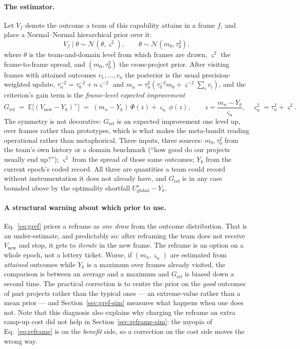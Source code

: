\documentclass[11pt]{article}
\newcommand{\E}{\mathbb{E}}
\begin{document}
\paragraph{The estimator.} Let $V_f$ denote the outcome a team of this capability attains in a frame $f$, and place a Normal--Normal hierarchical prior over it:
\begin{equation}
\label{eq:gref-prior}
V_f \mid \theta \sim \mathcal N(\theta,\varsigma^2),
\qquad \theta \sim \mathcal N(m_0,\tau_0^2),
\end{equation}
where $\theta$ is the team-and-domain level from which frames are drawn, $\varsigma^2$ the frame-to-frame spread, and $(m_0,\tau_0^2)$ the cross-project prior. After visiting frames with attained outcomes $v_1,\dots,v_n$ the posterior is the usual precision-weighted update, $\tau_n^{-2}=\tau_0^{-2}+n\varsigma^{-2}$ and $m_n=\tau_n^2(\tau_0^{-2}m_0+\varsigma^{-2}\sum_i v_i)$, and the criterion's gain term is the \emph{frame-level expected improvement}
\begin{equation}
\label{eq:gref}
G_{\text{ref}} \;=\; \E\big[(V_{\text{new}}-Y_k)^{+}\big]
\;=\; (m_n-Y_k)\,\Phi(z) + \varsigma_n\,\phi(z),
\qquad z=\frac{m_n-Y_k}{\varsigma_n},\quad \varsigma_n^2=\tau_n^2+\varsigma^2 .
\end{equation}
The symmetry is not decorative: $G_{\text{ref}}$ is an expected improvement one level up, over frames rather than prototypes, which is what makes the meta-bandit reading operational rather than metaphorical. Three inputs, three sources: $m_0,\tau_0^2$ from the team's own history or a domain benchmark (``how good do our projects usually end up?''); $\varsigma^2$ from the spread of those same outcomes; $Y_k$ from the current epoch's coded record. All three are quantities a team could record without instrumentation it does not already have, and $G_{\text{ref}}$ is in any case bounded above by the optimality shortfall $U^{\star}_{\text{global}}-Y_k$.

\paragraph{A structural warning about which prior to use.} Eq.~\eqref{eq:gref} prices a reframe as \emph{one draw} from the outcome distribution. That is an under-estimate, and predictably so: after reframing the team does not receive $V_{\text{new}}$ and stop, it gets to \emph{iterate} in the new frame. The reframe is an option on a whole epoch, not a lottery ticket. Worse, if $(m_n,\varsigma_n)$ are estimated from \emph{attained} outcomes while $Y_k$ is a maximum over frames already visited, the comparison is between an average and a maximum and $G_{\text{ref}}$ is biased down a second time. The practical correction is to centre the prior on the \emph{good} outcomes of past projects rather than the typical ones --- an extreme-value rather than a mean prior --- and Section~\ref{sec:gref-sim} measures what happens when one does not. Note that this diagnosis also explains why charging the reframe an extra ramp-up cost did not help in Section~\ref{sec:reframe-sim}: the myopia of Eq.~\eqref{eq:reframe} is on the \emph{benefit} side, so a correction on the cost side moves the wrong way.
\end{document}
